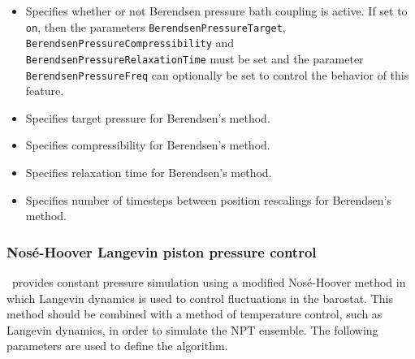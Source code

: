 \begin{itemize}

\item
{}
{Specifies whether or not Berendsen pressure bath coupling is active.  
If set to {\tt on}, then the parameters {\tt BerendsenPressureTarget}, {\tt BerendsenPressureCompressibility} and {\tt BerendsenPressureRelaxationTime} must be set 
and the parameter {\tt BerendsenPressureFreq} can
optionally be set to control the behavior of this feature.} 

\item
{}
{Specifies target pressure for Berendsen's method.}

\item
{}
{Specifies compressibility for Berendsen's method.}

\item
{}
{Specifies relaxation time for Berendsen's method.}

\item
{}
{Specifies number of timesteps between position rescalings for Berendsen's method.}

\end{itemize}

\subsubsection{Nos\'{e}-Hoover Langevin piston pressure control}

\NAMD\ provides constant pressure simulation using a modified Nos\'{e}-Hoover method in which Langevin dynamics is used to control fluctuations in the barostat.
This method should be combined with a method of temperature control, such as Langevin dynamics, in order to simulate the NPT ensemble.
The following parameters are used to define the algorithm.  

